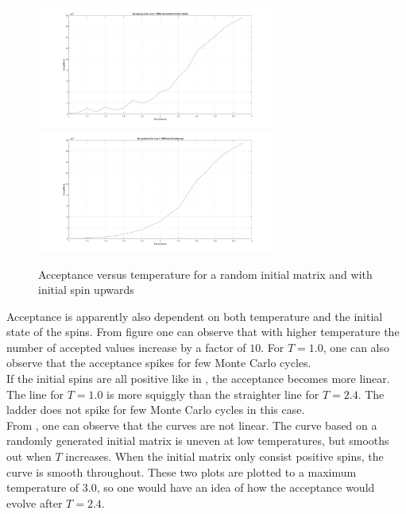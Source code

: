 \documentclass[10pt,a4paper]{article}
\begin{document}
\begin{figure}[H]
\centerline{
\includegraphics[width=0.7\textwidth]{acceptanceVStrandom}
\includegraphics[width=0.7\textwidth]{acceptanceVStupspin}
}
\caption{Acceptance versus temperature for a random initial matrix and with initial spin upwards}
\label{fig:acceptancetemp}
\end{figure}

\noindent Acceptance is apparently also dependent on both temperature and the initial state of the spins. From figure  one can observe that with higher temperature the number of accepted values increase by a factor of $10$. For $T = 1.0$, one can also observe that the acceptance spikes for few Monte Carlo cycles. 
\\
If the initial spins are all positive like in , the acceptance becomes more linear. The line for $T = 1.0$ is more squiggly than the straighter line for $T = 2.4$. The ladder does not spike for few Monte Carlo cycles in this case.
\\
From , one can observe that the curves are not linear. The curve based on a randomly generated initial matrix is uneven at low temperatures, but smooths out when $T$ increases. When the initial matrix only consist positive spins, the curve is smooth throughout. These two plots are plotted to a maximum temperature of $3.0$, so one would have an idea of how the acceptance would evolve after $T = 2.4$. 
\end{document}
